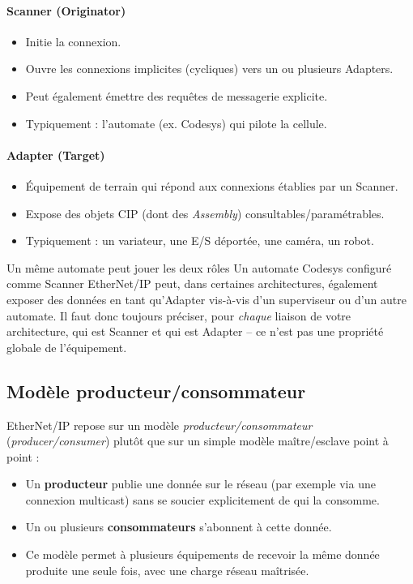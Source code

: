 \begin{minipage}{0.47\linewidth}
    \paragraph{Scanner (Originator)}
    \begin{itemize}
        \item Initie la connexion.
        \item Ouvre les connexions implicites (cycliques) vers un ou plusieurs Adapters.
        \item Peut également émettre des requêtes de messagerie explicite.
        \item Typiquement : l'automate (ex. Codesys) qui pilote la cellule.
    \end{itemize}
\end{minipage}%
\hfill%
\begin{minipage}{0.47\linewidth}
    \paragraph{Adapter (Target)}
    \begin{itemize}
        \item Équipement de terrain qui répond aux connexions établies par un Scanner.
        \item Expose des objets CIP (dont des \emph{Assembly}) consultables/paramétrables.
        \item Typiquement : un variateur, une E/S déportée, une caméra, un robot.
    \end{itemize}
\end{minipage}

\begin{UPSTIidee}{Un même automate peut jouer les deux rôles}
    Un automate Codesys configuré comme Scanner EtherNet/IP peut, dans certaines architectures, également exposer des données en tant qu'Adapter vis-à-vis d'un superviseur ou d'un autre automate. Il faut donc toujours préciser, pour \emph{chaque} liaison de votre architecture, qui est Scanner et qui est Adapter -- ce n'est pas une propriété globale de l'équipement.
\end{UPSTIidee}

\subsection{Modèle producteur/consommateur}
EtherNet/IP repose sur un modèle \emph{producteur/consommateur} (\emph{producer/consumer}) plutôt que sur un simple modèle maître/esclave point à point :
\begin{itemize}
    \item Un \textbf{producteur} publie une donnée sur le réseau (par exemple via une connexion multicast) sans se soucier explicitement de qui la consomme.
    \item Un ou plusieurs \textbf{consommateurs} s'abonnent à cette donnée.
    \item Ce modèle permet à plusieurs équipements de recevoir la même donnée produite une seule fois, avec une charge réseau maîtrisée.
\end{itemize}

